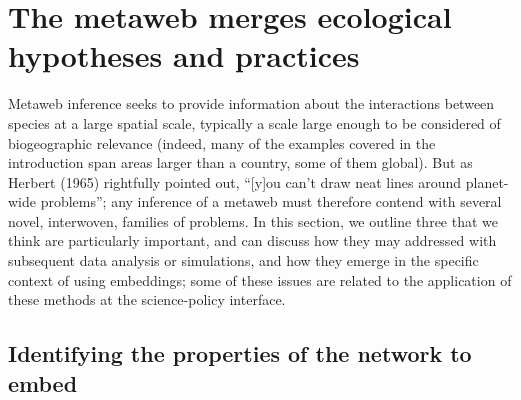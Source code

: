 \documentclass[11pt]{article}
\begin{document}
\hypertarget{the-metaweb-merges-ecological-hypotheses-and-practices}{%
\section{The metaweb merges ecological hypotheses and
practices}\label{the-metaweb-merges-ecological-hypotheses-and-practices}}

Metaweb inference seeks to provide information about the interactions
between species at a large spatial scale, typically a scale large enough
to be considered of biogeographic relevance (indeed, many of the
examples covered in the introduction span areas larger than a country,
some of them global). But as Herbert (1965) rightfully pointed out,
``{[}y{]}ou can't draw neat lines around planet-wide problems''; any
inference of a metaweb must therefore contend with several novel,
interwoven, families of problems. In this section, we outline three that
we think are particularly important, and can discuss how they may
addressed with subsequent data analysis or simulations, and how they
emerge in the specific context of using embeddings; some of these issues
are related to the application of these methods at the science-policy
interface.

\hypertarget{identifying-the-properties-of-the-network-to-embed}{%
\subsection{Identifying the properties of the network to
embed}\label{identifying-the-properties-of-the-network-to-embed}}
\end{document}
